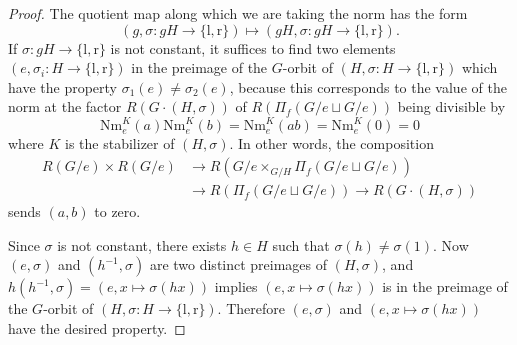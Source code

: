 \documentclass[10pt,a4paper]{amsart}
\begin{document}
\begin{proof}
	The quotient map along which we are taking the norm has the form \[ (g, \sigma : gH \rightarrow \{ \mathrm{l} , \mathrm{r} \}) \mapsto (gH, \sigma : gH \rightarrow \{ \mathrm{l} , \mathrm{r} \}) . \] If $\sigma : gH \rightarrow \{ \mathrm{l} , \mathrm{r} \}$ is not constant, it suffices to find two elements $(e, \sigma_i : H \rightarrow \{ \mathrm{l} , \mathrm{r} \})$ in the preimage of the $G$-orbit of $(H, \sigma : H \rightarrow \{ \mathrm{l} , \mathrm{r} \})$ which have the property $\sigma_1(e) \neq \sigma_2(e)$, because this corresponds to the value of the norm at the factor $R(G \cdot (H,\sigma))$ of $R(\Pi_f (G/e \sqcup G/e))$ being divisible by \[ \mathrm{Nm}_e^K(a) \mathrm{Nm}_e^K(b) = \mathrm{Nm}_e^K(ab) = \mathrm{Nm}_e^K(0) = 0 \] where $K$ is the stabilizer of $(H,\sigma)$. In other words, the composition 
    \begin{align*}
        R(G/e) \times R(G/e) & \rightarrow R(G/e \times_{G/H} \Pi_f (G/e \sqcup G/e)) \\
        & \rightarrow R(\Pi_f (G/e \sqcup G/e)) \rightarrow R(G \cdot (H,\sigma))
    \end{align*} 
    sends $(a,b)$ to zero.
	
	Since $\sigma$ is not constant, there exists $h \in H$ such that $\sigma(h) \neq \sigma(1)$. Now $(e, \sigma)$ and $(h^{-1},\sigma)$ are two distinct preimages of $(H,\sigma)$, and $h(h^{-1},\sigma) = (e,x \mapsto \sigma(hx))$ implies $(e,x\mapsto \sigma(hx))$ is in the preimage of the $G$-orbit of $(H, \sigma : H \rightarrow \{ \mathrm{l} , \mathrm{r} \})$. Therefore $(e,\sigma)$ and $(e,x \mapsto \sigma(hx))$ have the desired property.
\end{proof}
\end{document}
